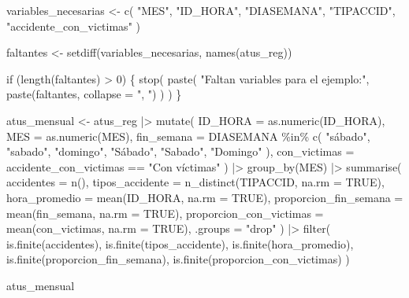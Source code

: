 \documentclass[
  spanish,
  10.5pt,
  letterpaper,
  openany,
  headings=big]{scrbook}
\newenvironment{Shaded}{}{}
\newcommand{\AttributeTok}[1]{\textcolor[rgb]{0.84,0.23,0.29}{#1}}
\newcommand{\ConstantTok}[1]{\textcolor[rgb]{0.00,0.36,0.77}{#1}}
\newcommand{\ControlFlowTok}[1]{\textcolor[rgb]{0.84,0.23,0.29}{#1}}
\newcommand{\DecValTok}[1]{\textcolor[rgb]{0.00,0.36,0.77}{#1}}
\newcommand{\FunctionTok}[1]{\textcolor[rgb]{0.44,0.26,0.76}{#1}}
\newcommand{\NormalTok}[1]{\textcolor[rgb]{0.14,0.16,0.18}{#1}}
\newcommand{\OtherTok}[1]{\textcolor[rgb]{0.44,0.26,0.76}{#1}}
\newcommand{\SpecialCharTok}[1]{\textcolor[rgb]{0.00,0.36,0.77}{#1}}
\newcommand{\StringTok}[1]{\textcolor[rgb]{0.01,0.18,0.38}{#1}}
\begin{document}
\begin{Shaded}
\begin{Highlighting}[]
\NormalTok{variables\_necesarias }\OtherTok{\textless{}{-}} \FunctionTok{c}\NormalTok{(}
  \StringTok{"MES"}\NormalTok{, }\StringTok{"ID\_HORA"}\NormalTok{, }\StringTok{"DIASEMANA"}\NormalTok{, }\StringTok{"TIPACCID"}\NormalTok{,}
  \StringTok{"accidente\_con\_victimas"}
\NormalTok{)}

\NormalTok{faltantes }\OtherTok{\textless{}{-}} \FunctionTok{setdiff}\NormalTok{(variables\_necesarias, }\FunctionTok{names}\NormalTok{(atus\_reg))}

\ControlFlowTok{if}\NormalTok{ (}\FunctionTok{length}\NormalTok{(faltantes) }\SpecialCharTok{\textgreater{}} \DecValTok{0}\NormalTok{) \{}
  \FunctionTok{stop}\NormalTok{(}
    \FunctionTok{paste}\NormalTok{(}
      \StringTok{"Faltan variables para el ejemplo:"}\NormalTok{,}
      \FunctionTok{paste}\NormalTok{(faltantes, }\AttributeTok{collapse =} \StringTok{", "}\NormalTok{)}
\NormalTok{    )}
\NormalTok{  )}
\NormalTok{\}}

\NormalTok{atus\_mensual }\OtherTok{\textless{}{-}}\NormalTok{ atus\_reg }\SpecialCharTok{|\textgreater{}}
  \FunctionTok{mutate}\NormalTok{(}
    \AttributeTok{ID\_HORA =} \FunctionTok{as.numeric}\NormalTok{(ID\_HORA),}
    \AttributeTok{MES =} \FunctionTok{as.numeric}\NormalTok{(MES),}
    \AttributeTok{fin\_semana =}\NormalTok{ DIASEMANA }\SpecialCharTok{\%in\%} \FunctionTok{c}\NormalTok{(}
      \StringTok{"sábado"}\NormalTok{, }\StringTok{"sabado"}\NormalTok{, }\StringTok{"domingo"}\NormalTok{,}
      \StringTok{"Sábado"}\NormalTok{, }\StringTok{"Sabado"}\NormalTok{, }\StringTok{"Domingo"}
\NormalTok{    ),}
    \AttributeTok{con\_victimas =}\NormalTok{ accidente\_con\_victimas }\SpecialCharTok{==} \StringTok{"Con víctimas"}
\NormalTok{  ) }\SpecialCharTok{|\textgreater{}}
  \FunctionTok{group\_by}\NormalTok{(MES) }\SpecialCharTok{|\textgreater{}}
  \FunctionTok{summarise}\NormalTok{(}
    \AttributeTok{accidentes =} \FunctionTok{n}\NormalTok{(),}
    \AttributeTok{tipos\_accidente =} \FunctionTok{n\_distinct}\NormalTok{(TIPACCID, }\AttributeTok{na.rm =} \ConstantTok{TRUE}\NormalTok{),}
    \AttributeTok{hora\_promedio =} \FunctionTok{mean}\NormalTok{(ID\_HORA, }\AttributeTok{na.rm =} \ConstantTok{TRUE}\NormalTok{),}
    \AttributeTok{proporcion\_fin\_semana =} \FunctionTok{mean}\NormalTok{(fin\_semana, }\AttributeTok{na.rm =} \ConstantTok{TRUE}\NormalTok{),}
    \AttributeTok{proporcion\_con\_victimas =} \FunctionTok{mean}\NormalTok{(con\_victimas, }\AttributeTok{na.rm =} \ConstantTok{TRUE}\NormalTok{),}
    \AttributeTok{.groups =} \StringTok{"drop"}
\NormalTok{  ) }\SpecialCharTok{|\textgreater{}}
  \FunctionTok{filter}\NormalTok{(}
    \FunctionTok{is.finite}\NormalTok{(accidentes),}
    \FunctionTok{is.finite}\NormalTok{(tipos\_accidente),}
    \FunctionTok{is.finite}\NormalTok{(hora\_promedio),}
    \FunctionTok{is.finite}\NormalTok{(proporcion\_fin\_semana),}
    \FunctionTok{is.finite}\NormalTok{(proporcion\_con\_victimas)}
\NormalTok{  )}

\NormalTok{atus\_mensual}
\end{Highlighting}
\end{Shaded}
\end{document}
